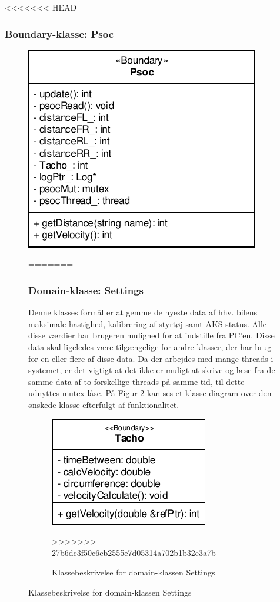 <<<<<<< HEAD
\subsubsection{Boundary-klasse: Psoc}

\begin{figure}[h]
\centering
\includegraphics[]{../fig/diagrammer/bil/cd_psoc.pdf}
\caption{Klassebeskrivelse af boundary-klassen Psoc}
\label{fig:cd_psoc}
=======
\subsubsection{Domain-klasse: Settings}

Denne klasses formål er at gemme de nyeste data af hhv. bilens maksimale hastighed, kalibrering af styrtøj samt AKS status. Alle disse værdier har brugeren mulighed for at indstille fra PC'en. Disse data skal ligeledes være tilgængelige for andre klasser, der har brug for en eller flere af disse data. Da der arbejdes med mange threads i systemet, er det vigtigt at det ikke er muligt at skrive og læse fra de samme data af to forskellige threads på samme tid, til dette udnyttes mutex låse. På Figur \ref{fig:cd_settings} kan ses et klasse diagram over den ønskede klasse efterfulgt af funktionalitet.

\begin{figure}[h]
\centering
\includegraphics[]{../fig/diagrammer/bil/cd_tachometer.pdf}
\caption{Klassebeskrivelse for domain-klassen Settings}
\label{fig:cd_settings}
>>>>>>> 27b6dc3f50c6cb2555e7d05314a702b1b32e3a7b
\end{figure}


\end{figure}

